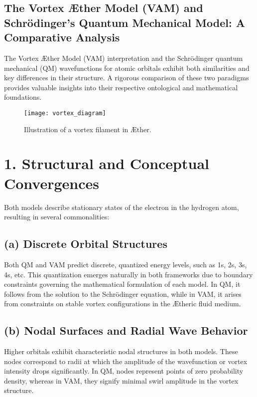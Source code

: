 

\subsection{The Vortex Æther Model (VAM) and Schrödinger's Quantum Mechanical Model: A Comparative Analysis}

The Vortex Æther Model (VAM) interpretation and the Schrödinger quantum mechanical (QM) wavefunctions for atomic orbitals exhibit both similarities and key differences in their structure. A rigorous comparison of these two paradigms provides valuable insights into their respective ontological and mathematical foundations.

\begin{figure}[h]
    \centering
    \texttt{[image: vortex\_diagram]}
    \caption{Illustration of a vortex filament in Æther.}
    \label{fig:vortex}
\end{figure}

\section*{1. Structural and Conceptual Convergences}

Both models describe stationary states of the electron in the hydrogen atom, resulting in several commonalities:

\subsection*{(a) Discrete Orbital Structures}

Both QM and VAM predict discrete, quantized energy levels, such as 1s, 2s, 3s, 4s, etc. This quantization emerges naturally in both frameworks due to boundary constraints governing the mathematical formulation of each model. In QM, it follows from the solution to the Schrödinger equation, while in VAM, it arises from constraints on stable vortex configurations in the Ætheric fluid medium.

\subsection*{(b) Nodal Surfaces and Radial Wave Behavior}

Higher orbitals exhibit characteristic nodal structures in both models. These nodes correspond to radii at which the amplitude of the wavefunction or vortex intensity drops significantly. In QM, nodes represent points of zero probability density, whereas in VAM, they signify minimal swirl amplitude in the vortex structure.

